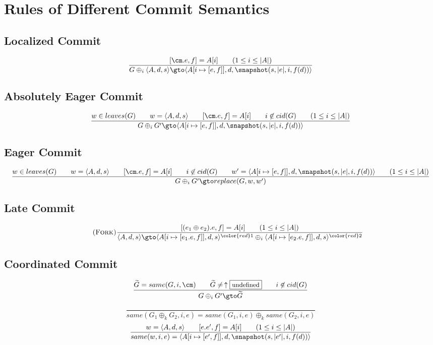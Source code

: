 \begin{minipage}{\textwidth}

\section{Rules of Different Commit Semantics}\label{sec:commits}

\subsection{Localized Commit}

\[
  \label{rule:localized-commit}
  \frac{
    [\cm.e,f]=A[i] \qquad
    (1\le i\le |A|)
  }
  {G\oplus_i\langle A,d,s\rangle \gto \langle A[i\mapsto[e,f]],d,\snapshot(s,|e|,i,f(d))\rangle}
\]

\subsection{Absolutely Eager Commit}

\[
  \label{rule:abs-eager-commit}
  \frac{
    w\in leaves(G) \qquad
    w=\langle A,d,s\rangle \qquad
    [\cm.e,f]=A[i] \qquad
    i\not\in cid(G) \qquad
    (1\le i\le |A|)
  }
  {G\oplus_i G' \gto \langle A[i\mapsto[e,f]],d,\snapshot(s,|e|,i,f(d))\rangle}
\]

\subsection{Eager Commit}

\[
  \label{rule:eager-commit}
  \frac{
    w\in leaves(G) \qquad
    w=\langle A,d,s\rangle \qquad
    [\cm.e,f]=A[i] \qquad
    i\not\in cid(G) \qquad
    w'=\langle A[i\mapsto[e,f]],d,\snapshot(s,|e|,i,f(d))\rangle \qquad
    (1\le i\le |A|)
  }
  {G\oplus_i G' \gto replace(G,w,w')}
\]

\subsection{Late Commit}

\[
  \tag{\sc Fork}
  \frac{
    {[(e_1\oplus e_2).e,f]=A[i]}\qquad
    {(1\le i\le |A|)}}
  {\langle A,d,s\rangle \gto
    \langle A[i\mapsto[e_1.e,f]],d,s\rangle^{\color{red} 1} \oplus_i
    \langle A[i\mapsto[e_2.e,f]],d,s\rangle^{\color{red} 2}}
\]

\subsection{Coordinated Commit}

\[
  \label{rule:eager-commit}
  \frac{
    \widetilde{G}=same(G,i,\cm) \qquad
    \widetilde{G}\neq\,\uparrow\fbox{\small undefined} \qquad
    i\not\in cid(G)
  }
  {G\oplus_i G'\gto\widetilde{G}}
\]

\[
  \frac{}
  { same(G_1\oplus_k G_2,i,e) = same(G_1,i,e)\oplus_k same(G_2,i,e) }
\]
\[
  \frac{
    w = \langle A,d,s\rangle \qquad
    [e.e',f]=A[i] \qquad
    (1\le i\le |A|)
  }
  { same(w,i,e) = \langle A[i\mapsto[e',f]],d,\snapshot(s,|e'|,i,f(d))\rangle }
\]

\end{minipage}
